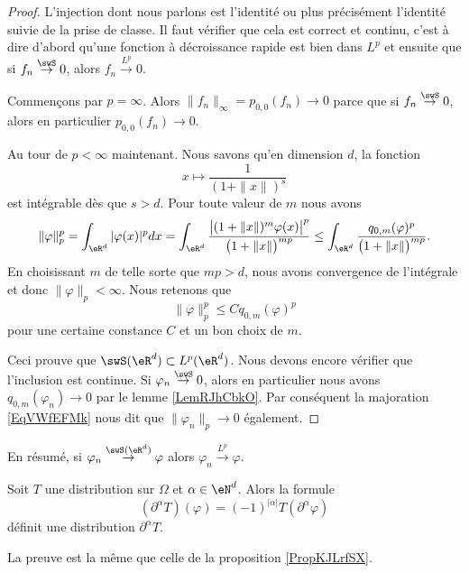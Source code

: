 \begin{proof}
    L'injection dont nous parlons est l'identité ou plus précisément l'identité suivie de la prise de classe. Il faut vérifier que cela est correct et continu, c'est à dire d'abord qu'une fonction à décroissance rapide est bien dans \( L^p\) et ensuite que si \( f_n\stackrel{\swS}{\to}0\), alors \( f_n\stackrel{L^p}{\to}0\).
    
    Commençons par \( p=\infty\). Alors \( \| f_n \|_{\infty}=p_{0,0}(f_n)\to 0\) parce que si \( f_n\stackrel{\swS}{\to}0\), alors en particulier \( p_{0,0}(f_n)\to 0\).

    Au tour de \( p<\infty\) maintenant. Nous savons qu'en dimension \( d\), la fonction
    \begin{equation}
        x\mapsto \frac{1}{ (1+\| x \|)^s }
    \end{equation}
    est intégrable dès que \( s>d\).
    Pour toute valeur de \( m\) nous avons
    \begin{equation}
        \| \varphi \|_p^p=\int_{\eR^d}| \varphi(x) |^pdx=\int_{\eR^d}\frac{ \big|    (1+\| x \|)^m\varphi(x)   \big|^p }{ \big( 1+\| x \| \big)^{mp} }\leq\int_{\eR^d}\frac{q_{0,m}(\varphi)^p}{ \big( 1+\| x \| \big)^{mp} }.
    \end{equation}
    En choisissant \( m\) de telle sorte que \( mp>d\), nous avons convergence de l'intégrale et donc \( \| \varphi \|_p<\infty\). Nous retenons que
    \begin{equation}    \label{EqVWfEFMk}
        \| \varphi \|_p^p\leq Cq_{0,m}(\varphi)^p
    \end{equation}
    pour une certaine constance \( C\) et un bon choix de \( m\).

    Ceci prouve que \( \swS(\eR^d)\subset L^p(\eR^d)\). Nous devons encore vérifier que l'inclusion est continue. Si \( \varphi_n\stackrel{\swS}{\to}0\), alors en particulier nous avons \( q_{0,m}(\varphi_n)\to 0\) par le lemme \ref{LemRJhCbkO}. Par conséquent la majoration \eqref{EqVWfEFMk} nous dit que \( \| \varphi_n \|_p\to 0\) également.

\end{proof}
En résumé, si \( \varphi_n\stackrel{\swS(\eR^d)}{\to}\varphi\) alors \( \varphi_n\stackrel{L^p}{\to}\varphi\).

\begin{proposition} \label{PropVLEWffA}
    Soit \( T\) une distribution sur \( \Omega\) et \( \alpha\in \eN^d\). Alors la formule
    \begin{equation}
        (\partial^{\alpha}T)(\varphi)=(-1)^{| \alpha |}T(\partial^{\alpha}\varphi)
    \end{equation}
    définit une distribution \( \partial^{\alpha}T\).
\end{proposition}
La preuve est la même que celle de la proposition \ref{PropKJLrfSX}.




